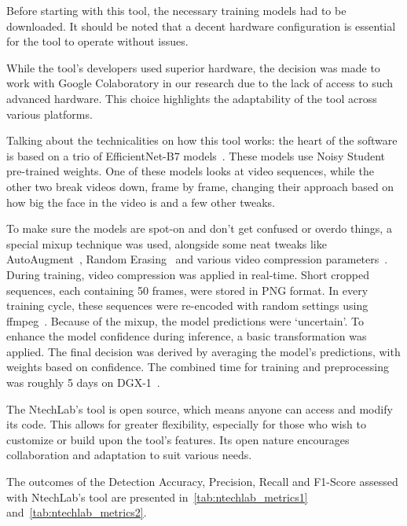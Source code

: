 Before starting with this tool, the necessary training models had to be downloaded.
It should be noted that a decent hardware configuration is essential for the tool
to operate without issues.

While the tool's developers used superior hardware, the decision was made
to work with Google Colaboratory in our research due to the lack of access to such
advanced hardware. This choice highlights the adaptability of the tool
across various platforms.

Talking about the technicalities on how this tool works: the heart of the software is
based on a trio of EfficientNet-B7 models~\cite{tan2020efficientnet}.
These models use Noisy Student~\cite{xie2020selftraining} pre-trained weights.
One of these models looks at video sequences, while the other two break videos
down, frame by frame, changing their approach based on how big the face in the
video is and a few other tweaks.

To make sure the models are spot-on and don't get confused or overdo things,
a special mixup technique was used, alongside some neat tweaks like
AutoAugment~\cite{cubuk2019autoaugment}, Random Erasing~\cite{zhong2017random}
and various video compression parameters~\cite{ntechlab-github}. During training,
video compression was applied in real-time. Short cropped sequences, each
containing 50 frames, were stored in PNG format. In every training cycle, these
sequences were re-encoded with random settings using ffmpeg~\cite{enwiki:1156808546}.
Because of the mixup, the model predictions were `uncertain'. To enhance the model
confidence during inference, a basic transformation was applied. The final
decision was derived by averaging the model's predictions, with weights
based on confidence. The combined time for training and preprocessing was
roughly 5 days on DGX-1~\cite{enwiki:1168440769}.

The NtechLab's tool is open source, which means anyone can access and modify its
code. This allows for greater flexibility, especially for those who wish to
customize or build upon the tool's features. Its open nature encourages
collaboration and adaptation to suit various needs.

The outcomes of the Detection Accuracy, Precision, Recall and F1-Score assessed
with NtechLab's tool are presented in~\autoref{tab:ntechlab_metrics1} and~\autoref{tab:ntechlab_metrics2}.

